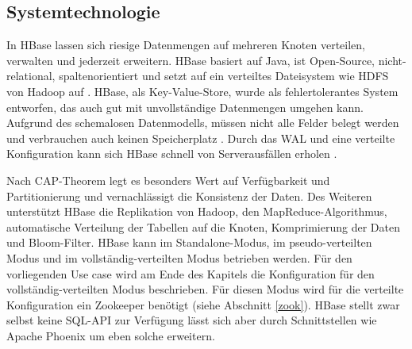 
\subsection{Systemtechnologie} %
 In HBase lassen sich riesige Datenmengen auf mehreren Knoten verteilen, verwalten und jederzeit erweitern. HBase basiert auf Java, ist Open-Source, nicht-relational, spaltenorientiert und setzt auf ein verteiltes Dateisystem wie \ac{HDFS} von Hadoop auf \cite{hbasetut}. HBase, als Key-Value-Store, wurde als fehlertolerantes System entworfen, das auch gut mit unvollständige Datenmengen umgehen kann. Aufgrund des schemalosen Datenmodells, müssen nicht alle Felder belegt werden und verbrauchen auch keinen Speicherplatz \cite{compWo}.  Durch das \ac{WAL} und eine verteilte Konfiguration kann sich HBase schnell von Serverausfällen erholen \cite{Redt01}. 
 
 Nach CAP-Theorem legt es besonders Wert auf Verfügbarkeit und Partitionierung und vernachlässigt die Konsistenz der Daten. 
 Des Weiteren unterstützt HBase die Replikation von Hadoop, den MapReduce-Algorithmus, automatische Verteilung der Tabellen auf die Knoten, Komprimierung der Daten und Bloom-Filter. HBase kann im Standalone-Modus, im pseudo-verteilten Modus und im vollständig-verteilten Modus betrieben werden. Für den vorliegenden Use case wird am Ende des Kapitels die Konfiguration für den vollständig-verteilten Modus beschrieben. Für diesen Modus wird für die verteilte Konfiguration ein Zookeeper benötigt (siehe Abschnitt \ref{zook}). HBase stellt zwar selbst keine SQL-API zur Verfügung lässt sich aber durch Schnittstellen wie Apache Phoenix um eben solche erweitern.

